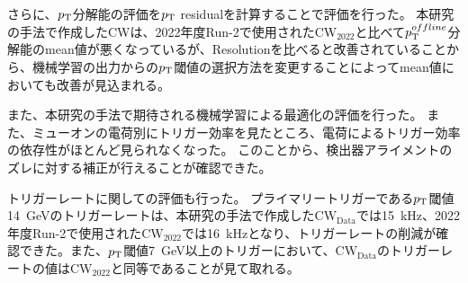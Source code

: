 
さらに、$p_{\rm{T}}$分解能の評価を$p_{\rm{T}}$ residualを計算することで評価を行った。
本研究の手法で作成したCWは、2022年度Run-2で使用された$\mathrm{CW_{2022}}$と比べて$p_{\rm{T}}^{offline}$分解能のmean値が悪くなっているが、Resolutionを比べると改善されていることから、機械学習の出力からの$p_{\rm{T}}$閾値の選択方法を変更することによってmean値においても改善が見込まれる。

また、本研究の手法で期待される機械学習による最適化の評価を行った。
また、ミューオンの電荷別にトリガー効率を見たところ、電荷によるトリガー効率の依存性がほとんど見られなくなった。
このことから、検出器アライメントのズレに対する補正が行えることが確認できた。

トリガーレートに関しての評価も行った。
プライマリートリガーである$p_{\rm{T}}$閾値14~GeVのトリガーレートは、本研究の手法で作成した$\mathrm{CW_{Data}}$では15~kHz、2022年度Run-2で使用された$\mathrm{CW_{2022}}$では16~kHzとなり、トリガーレートの削減が確認できた。また、$p_{\rm{T}}$閾値7~GeV以上のトリガーにおいて、$\mathrm{CW_{Data}}$のトリガーレートの値は$\mathrm{CW_{2022}}$と同等であることが見て取れる。


